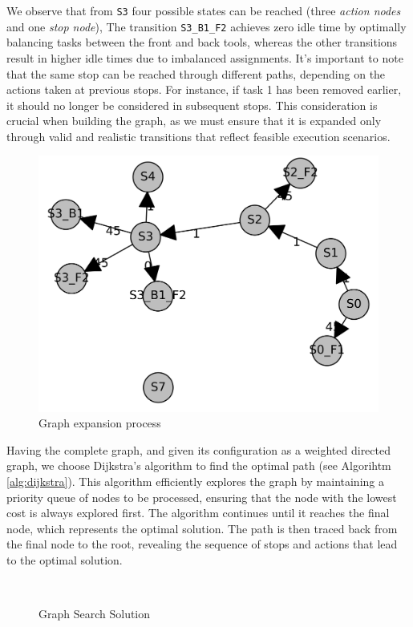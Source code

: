 We observe that from \texttt{S3} four possible states can be reached (three \textit{action nodes} and one \textit{stop node}), The transition \texttt{S3\_B1\_F2} achieves zero idle time by optimally balancing tasks between the front and back tools, whereas the other transitions result in higher idle times due to imbalanced assignments. It's important to note that the same stop can be reached through different paths, depending on the actions taken at previous stops. For instance, if task 1 has been removed earlier, it should no longer be considered in subsequent stops. This consideration is crucial when building the graph, as we must ensure that it is expanded only through valid and realistic transitions that reflect feasible execution scenarios.

\begin{figure}[hbt]
    \centering
    \includegraphics[width=0.7\linewidth]{gfx/ch03/building_graph.png}
    \caption{Graph expansion process}
    \label{fig:building-graph}
\end{figure}

Having the complete graph, and given its configuration as a weighted directed graph, we choose Dijkstra's algorithm to find the optimal path (see Algorihtm \ref{alg:dijkstra}). This algorithm efficiently explores the graph by maintaining a priority queue of nodes to be processed, ensuring that the node with the lowest cost is always explored first. The algorithm continues until it reaches the final node, which represents the optimal solution. The path is then traced back from the final node to the root, revealing the sequence of stops and actions that lead to the optimal solution.

\begin{figure}[htb]
    \myfloatalign
     \quad
     \\
    \caption{Graph Search Solution}\label{fig:graph-search-solution}
\end{figure}

